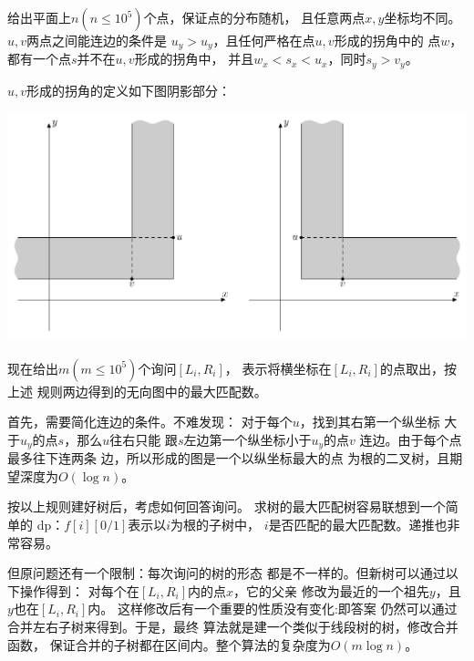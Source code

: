 \begin{prob}
	给出平面上$n(n \le 10^5)$个点，保证点的分布随机，
	且任意两点$x,y$坐标均不同。
	$u,v$两点之间能连边的条件是
	$u_y > u_y$，且任何严格在点$u,v$形成的拐角中的
	点$w$，都有一个点$s$并不在$u,v$形成的拐角中，
	并且$w_x < s_x < u_x$，同时$s_y > v_y$。\par
	$u,v$形成的拐角的定义如下图阴影部分：
	\par
	{\centering
	\includegraphics[scale=0.75]{167D.png} } 
	\par
	
	现在给出$m(m \le 10^5)$个询问$[L_i, R_i]$，
	表示将横坐标在$[L_i, R_i]$的点取出，按上述
	规则两边得到的无向图中的最大匹配数。

\end{prob}

\begin{sol}
	首先，需要简化连边的条件。不难发现：
	对于每个$u$，找到其右第一个纵坐标
	大于$u_y$的点$s$，那么$u$往右只能
	跟$s$左边第一个纵坐标小于$u_y$的点$v$
	连边。由于每个点最多往下连两条
	边，所以形成的图是一个以纵坐标最大的点
	为根的二叉树，且期望深度为$O(\log n)$。
	\par
	按以上规则建好树后，考虑如何回答询问。
	求树的最大匹配树容易联想到一个简单的
	dp：$f[i][0/1]$表示以$i$为根的子树中，
	$i$是否匹配的最大匹配数。递推也非常容易。\par
	但原问题还有一个限制：每次询问的树的形态
	都是不一样的。但新树可以通过以下操作得到：
	对每个在$[L_i, R_i]$内的点$x$，它的父亲
	修改为最近的一个祖先$y$，且$y$也在$[L_i, R_i]$内。
	这样修改后有一个重要的性质没有变化:即答案
	仍然可以通过合并左右子树来得到。于是，最终
	算法就是建一个类似于线段树的树，修改合并函数，
	保证合并的子树都在区间内。整个算法的复杂度为$O(m \log n)$。
\end{sol}
